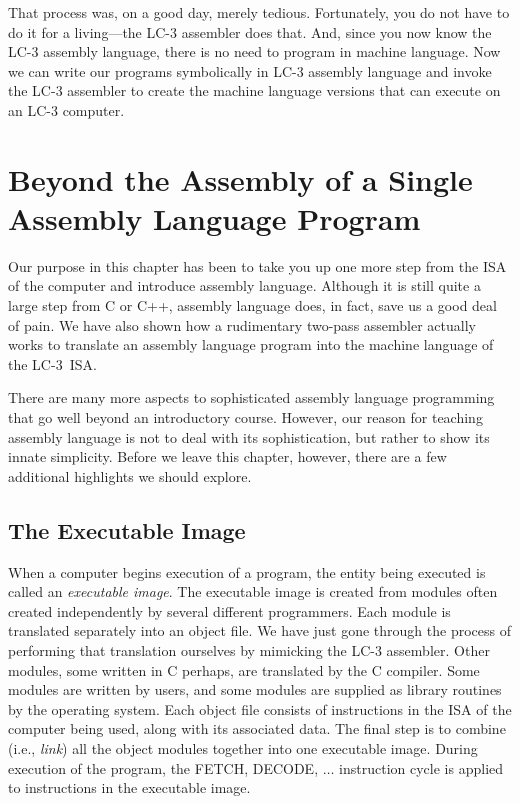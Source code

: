 \documentclass{patt}
\begin{document}
That process was, on a good day, merely tedious. Fortunately, you do
not have to do it for a living---the LC-3 assembler does that.  And,
since you now know the LC-3 assembly language, there is no need to program
in machine language.  Now we can write our programs symbolically in
LC-3 assembly language and invoke the LC-3 assembler to create the
machine language versions that can execute on an LC-3 computer.

\vspace{-6pt}

\section{Beyond the Assembly of a Single Assembly Language Program}

Our purpose in this chapter has been to take you up one more step
from the ISA of the computer and introduce assembly language.
Although it is still quite a large step from C or C++, assembly
language does, in fact, save us a good deal of pain.  We have also
shown how a rudimentary two-pass assembler actually works to translate
an assembly language program into the machine language of the LC-3~ISA.

There are many more aspects to sophisticated assembly language
programming that go well beyond an introductory course. However, our
reason for teaching assembly language is not to deal with its
sophistication, but rather to show its innate simplicity. Before we
leave this chapter, however, there are a few additional highlights we
should explore.

\subsection{The Executable Image}
\label{sec:exe_image}

When a computer begins execution of a program, the entity being
executed is called an {\em executable image}. The executable image is
created from modules  often created
independently by several different programmers.  Each module is
translated separately into an object file. We have just gone through
the process of performing that translation ourselves by mimicking the
LC-3 assembler. Other modules, some written in C perhaps, are
translated by the C compiler.  Some modules are written by users, and
some modules are supplied as library routines by the operating system.
Each object file consists of instructions in the ISA of the computer
being used, along with its associated data. The final step is to combine
(i.e., {\em link}) all the object modules together into one
executable image. During execution of the program, the FETCH, DECODE,
$\ldots$ instruction cycle is applied to instructions in the
executable image.
\end{document}

